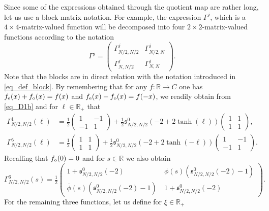 \documentclass[11pt]{article}
\def\R{\mathbb R}
\def\s{\mathfrak s}
\begin{document}
Since some of the expressions obtained through the quotient map are rather long, let us use a block matrix notation. For example, the expression $\Gamma^j$, which is a $4\times 4$-matrix-valued function will be decomposed into four $2\times 2$-matrix-valued functions according to the notation
\begin{equation}\label{eq_Gamma^j}
\Gamma^{j} = \left(\begin{smallmatrix}
\Gamma^{j}_{N/2,N/2} & \Gamma^{j}_{N/2,N} \\
\Gamma^{j}_{N,N/2} & \Gamma^{j}_{N,N}  
\end{smallmatrix}\right).
\end{equation}
Note that the blocks are in direct relation with the notation introduced in \eqref{eq_def_block}.
By remembering that for any $f:\R\to C$ one has $f_{\rm e}(x)+f_{\rm o}(x)=f(x)$ and $f_{\rm e}(x)-f_{\rm o}(x)=f(-x)$, we readily obtain from \eqref{eq_D1b} and for $\ell\in \R_+$ that
\begin{align*}
\Gamma^1_{N/2,N/2}(\ell) & =\tfrac12\left(\begin{smallmatrix}
    1 & -1\\
    -1 & 1
\end{smallmatrix}\right)+\tfrac12 \s^0_{N/2,N/2}(-2+2\tanh(\ell))\left(\begin{smallmatrix}
    1 & 1\\
    1 & 1
\end{smallmatrix}\right), \\
\Gamma^5_{N/2,N/2}(\ell) & = \tfrac12\left(\begin{smallmatrix}
    1 & 1\\
    1 & 1
\end{smallmatrix}\right)+\tfrac12 \s^0_{N/2,N/2}(-2+2\tanh(-\ell))\left(\begin{smallmatrix}
    1 & -1\\
    -1 & 1
\end{smallmatrix}\right).
\end{align*} 
Recalling that $f_{\rm o}(0)=0$ and for $s\in \R$ we also obtain
\begin{equation*}
\Gamma^6_{N/2,N/2}(s) = \tfrac12\left(\begin{smallmatrix}
    1+  \s^0_{N/2,N/2}(-2)  & \ \phi(s)( \s^0_{N/2,N/2}(-2) -1)\\
    \overline{\phi}(s)( \s^0_{N/2,N/2}(-2) -1)  &\   1+  \s^0_{N/2,N/2}(-2) 
\end{smallmatrix}\right).
\end{equation*}
For the remaining three functions, let us define for $\xi \in \R_+$ 
\end{document}
